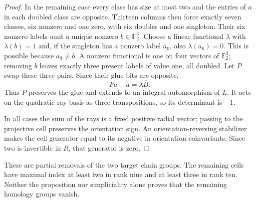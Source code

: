 \begin{proof}
In the remaining case every class has size at most two and the
entries of $a$ in each doubled class are opposite. Thirteen columns
then force exactly seven classes, six nonzero and one zero, with six
doubles and one singleton. Their six nonzero labels omit a unique
nonzero $b\in\mathbb F_2^3$. Choose a linear functional $\lambda$
with $\lambda(b)=1$ and, if the singleton has a nonzero label $a_0$,
also $\lambda(a_0)=0$. This is possible because $a_0\ne b$.
A nonzero functional is one on four vectors of $\mathbb F_2^3$;
removing $b$ leaves exactly three present labels of value one,
all doubled. Let $P$ swap these three pairs. Since their glue bits
are opposite,
\[
 Pa-a=\lambda\overline B.
\]
Thus $P$ preserves the glue and extends to an integral automorphism
of $L$. It acts on the quadratic-ray basis as three transpositions,
so its determinant is $-1$.

In all cases the sum of the rays is a fixed positive radial vector;
passing to the projective cell preserves the orientation sign.
An orientation-reversing stabilizer makes the cell generator equal
to its negative in orientation coinvariants. Since two is invertible
in $R$, that generator is zero.
\end{proof}

These are partial removals of the two target chain groups. The
remaining cells have maximal index at least two in rank nine and
at least three in rank ten. Neither the proposition nor simpliciality
alone proves that the remaining homology groups vanish.
